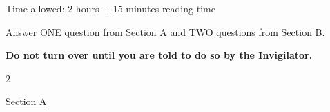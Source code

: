 \documentclass[12pt,a4paper]{article}
\begin{document}
\doublespacing 

\pagestyle{empty}

Time allowed:  2 hours + 15 minutes reading time
\vspace{.7in}

\singlespacing
Answer ONE question from Section A and TWO questions from Section B.


\vfill
\textbf {Do not turn over until you are told to do so by the Invigilator.}
\\
\newpage
\vspace*{-.8in}
\begin{center}
  2
\end{center}


\vspace{.3in}

\underline {Section A}
\end{document}
